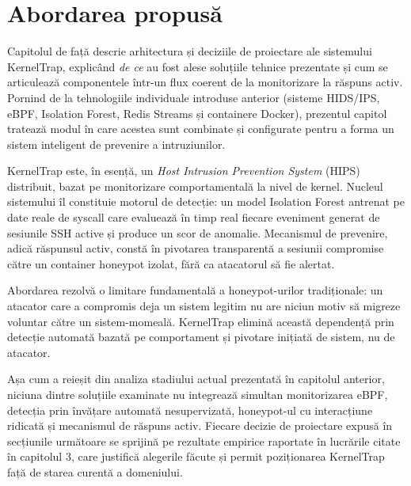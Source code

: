 
\chapter{Abordarea propusă}

Capitolul de față descrie arhitectura și deciziile de proiectare ale sistemului KernelTrap,
explicând \textit{de ce} au fost alese soluțiile tehnice prezentate și cum se articulează
componentele într-un flux coerent de la monitorizare la răspuns activ. Pornind de la tehnologiile
individuale introduse anterior (sisteme HIDS/IPS, eBPF, Isolation Forest, Redis Streams și
containere Docker), prezentul capitol tratează modul în care acestea sunt combinate și configurate
pentru a forma un sistem inteligent de prevenire a intruziunilor.

KernelTrap este, în esență, un \textit{Host Intrusion Prevention System} (HIPS) distribuit, bazat pe
monitorizare comportamentală la nivel de kernel. Nucleul sistemului îl constituie motorul de
detecție: un model Isolation Forest antrenat pe date reale de syscall care evaluează în timp real
fiecare eveniment generat de sesiunile SSH active și produce un scor de anomalie. Mecanismul de
prevenire, adică răspunsul activ, constă în pivotarea transparentă a sesiunii compromise către un
container honeypot izolat, fără ca atacatorul să fie alertat.

Abordarea rezolvă o limitare fundamentală a honeypot-urilor tradiționale: un atacator care a
compromis deja un sistem legitim nu are niciun motiv să migreze voluntar către un
sistem-momeală. KernelTrap elimină această dependență prin detecție automată bazată pe
comportament și pivotare inițiată de sistem, nu de atacator.

Așa cum a reieșit din analiza stadiului actual prezentată în capitolul anterior, niciuna dintre
soluțiile examinate nu integrează simultan monitorizarea eBPF, detecția prin învățare automată
nesupervizată, honeypot-ul cu interacțiune ridicată și mecanismul de răspuns activ. Fiecare
decizie de proiectare expusă în secțiunile următoare se sprijină pe rezultate empirice raportate
în lucrările citate în capitolul 3, care justifică alegerile făcute și permit poziționarea
KernelTrap față de starea curentă a domeniului.

